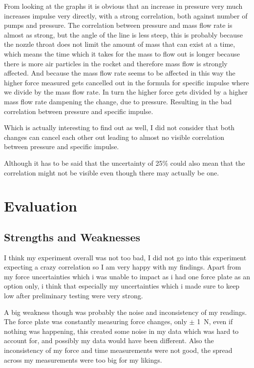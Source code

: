 \documentclass[12pt,a4paper]{article}
\begin{document}
From looking at the graphs it is obvious that an increase in pressure very much increases impulse very directly, with a strong correlation, both against number of pumps and pressure. The correlation between pressure and mass flow rate is almost as strong, but the angle of the line is less steep, this is probably because the nozzle throat does not limit the amount of mass that can exist at a time, which means the time which it takes for the mass to flow out is longer because there is more air particles in the rocket and therefore mass flow is strongly affected. And because the mass flow rate seems to be affected in this way the higher force measured gets cancelled out in the formula for specific impulse where we divide by the mass flow rate. In turn the higher force gets divided by a higher mass flow rate dampening the change, due to pressure. Resulting in the bad correlation between pressure and specific impulse.

Which is actually interesting to find out as well, I did not consider that both changes can cancel each other out leading to almost no visible correlation between pressure and specific impulse.

Although it has to be said that the uncertainty of 25\% could also mean that the correlation might not be visible even though there may actually be one.

\section{Evaluation}

\subsection{Strengths and Weaknesses}

I think my experiment overall was not too bad, I did not go into this experiment expecting a crazy correlation so I am very happy with my findings. Apart from my force uncertainties which i was unable to impact as i had one force plate as an option only, i think that especially my uncertainties which i made sure to keep low after preliminary testing were very strong.

A big weakness though was probably the noise and inconsistency of my readings. The force plate was constantly measuring force changes, only $\pm$ \SI{1}{\newton}, even if nothing was happening, this created some noise in my data which was hard to account for, and possibly my data would have been different. Also the inconsistency of my force and time measurements were not good, the spread across my measurements were too big for my likings.
\end{document}
